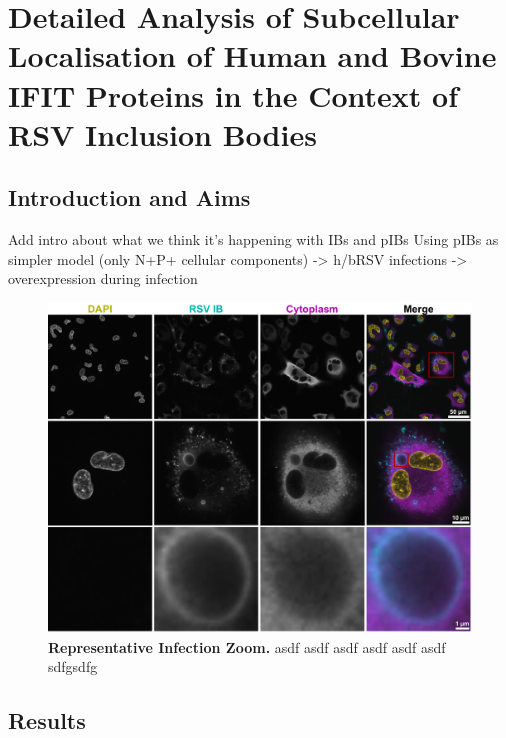 \chapter{Detailed Analysis of Subcellular Localisation of Human and Bovine IFIT Proteins in the Context of RSV Inclusion Bodies} \label{ch:Detailed Analysis of Subcellular Localisation of Human and Bovine IFIT Proteins in the Context of RSV Inclusion Bodies}

\section{Introduction and Aims} \label{sec:Introduction and Aims-Chapter4}
Add intro about what we think it’s happening with IBs and pIBs \newline
Using pIBs as simpler model (only N+P+ cellular components) -> h/bRSV infections -> overexpression during infection

\begin{figure}
    \centering
    \includegraphics[width=1\linewidth]{09. Chapter 4//Figs//01. Introduction/IB-zooms.pdf}
    \caption[Representative Infection Zoom.]{\textbf{Representative Infection Zoom.} asdf asdf asdf asdf asdf asdf sdfgsdfg}
    \label{fig:Representative Infection Zoom}
\end{figure}

\section{Results} \label{sec:Results-Chapter4}






